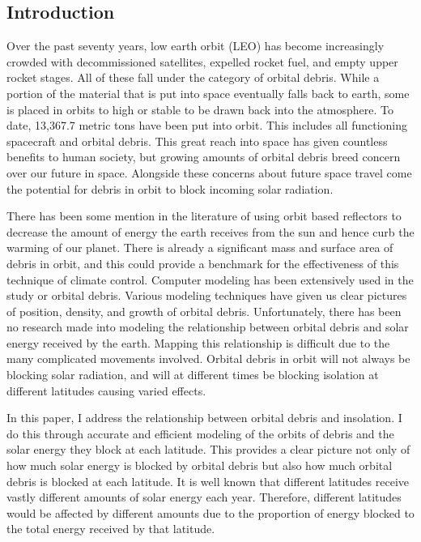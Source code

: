 \documentclass[11pt]{article}
\begin{document}
\begin{multicols*}{2}

\section{Introduction} \label{intro}
Over the past seventy years, low earth orbit (LEO) has become increasingly crowded with decommissioned satellites, expelled rocket fuel, and empty upper rocket stages. All of these fall under the category of orbital debris. While a portion of the material that is put into space eventually falls back to earth, some is placed in orbits to high or stable to be drawn back into the atmosphere. To date, 13,367.7 metric tons have been put into orbit. \cite{John} This includes all functioning spacecraft and orbital debris. This great reach into space has given countless benefits to human society, but growing amounts of orbital debris breed concern over our future in space. Alongside these concerns about future space travel come the potential for debris in orbit to block incoming solar radiation.

There has been some mention in the literature of using orbit based reflectors to decrease the amount of energy the earth receives from the sun and hence curb the warming of our planet. \cite{john} There is already a significant mass and surface area of debris in orbit, and this could provide a benchmark for the effectiveness of this technique of climate control. Computer modeling has been extensively used in the study or orbital debris. Various modeling techniques have given us clear pictures of position, density, and growth of orbital debris.\cite{john} Unfortunately, there has been no research made into modeling the relationship between orbital debris and solar energy received by the earth. Mapping this relationship is difficult due to the many complicated movements involved. Orbital debris in orbit will not always be blocking solar radiation, and will at different times be blocking isolation at different latitudes causing varied effects. 

In this paper, I address the relationship between orbital debris and insolation. I do this through accurate and efficient modeling of the orbits of debris and the solar energy they block at each latitude. This provides a clear picture not only of how much solar energy is blocked by orbital debris but also how much orbital debris is blocked at each latitude. It is well known that different latitudes receive vastly different amounts of solar energy each year.\cite{john} Therefore, different latitudes would be affected by different amounts due to the proportion of energy blocked to the total energy received by that latitude.


\end{multicols*}
\end{document}
